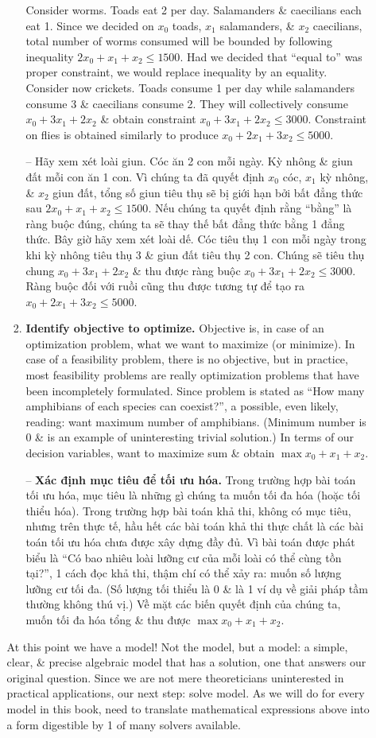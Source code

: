 \documentclass{article}
\begin{document}
\begin{itemize}
\begin{itemize}
\begin{enumerate}
            Consider worms. Toads eat 2 per day. Salamanders \& caecilians each eat 1. Since we decided on $x_0$ toads, $x_1$ salamanders, \& $x_2$ caecilians, total number of worms consumed will be bounded by following inequality $2x_0 + x_1 + x_2\le1500$. Had we decided that ``equal to'' was proper constraint, we would replace inequality by an equality. Consider now crickets. Toads consume 1 per day while salamanders consume 3 \& caecilians consume 2. They will collectively consume $x_0 + 3x_1 + 2x_2$ \& obtain constraint $x_0 + 3x_1 + 2x_2\le3000$. Constraint on flies is obtained similarly to produce $x_0 + 2x_1 + 3x_2\le5000$.

            -- Hãy xem xét loài giun. Cóc ăn 2 con mỗi ngày. Kỳ nhông \& giun đất mỗi con ăn 1 con. Vì chúng ta đã quyết định $x_0$ cóc, $x_1$ kỳ nhông, \& $x_2$ giun đất, tổng số giun tiêu thụ sẽ bị giới hạn bởi bất đẳng thức sau $2x_0 + x_1 + x_2\le1500$. Nếu chúng ta quyết định rằng ``bằng'' là ràng buộc đúng, chúng ta sẽ thay thế bất đẳng thức bằng 1 đẳng thức. Bây giờ hãy xem xét loài dế. Cóc tiêu thụ 1 con mỗi ngày trong khi kỳ nhông tiêu thụ 3 \& giun đất tiêu thụ 2 con. Chúng sẽ tiêu thụ chung $x_0 + 3x_1 + 2x_2$ \& thu được ràng buộc $x_0 + 3x_1 + 2x_2\le3000$. Ràng buộc đối với ruồi cũng thu được tương tự để tạo ra $x_0 + 2x_1 + 3x_2\le5000$.
            \item {\bf Identify objective to optimize.} Objective is, in case of an optimization problem, what we want to maximize (or minimize). In case of a feasibility problem, there is no objective, but in practice, most feasibility problems are really optimization problems that have been incompletely formulated. Since problem is stated as ``How many amphibians of each species can coexist?'', a possible, even likely, reading: want maximum number of amphibians. (Minimum number is 0 \& is an example of uninteresting trivial solution.) In terms of our decision variables, want to maximize sum \& obtain $\max x_0 + x_1 + x_2$.

            -- {\bf Xác định mục tiêu để tối ưu hóa.} Trong trường hợp bài toán tối ưu hóa, mục tiêu là những gì chúng ta muốn tối đa hóa (hoặc tối thiểu hóa). Trong trường hợp bài toán khả thi, không có mục tiêu, nhưng trên thực tế, hầu hết các bài toán khả thi thực chất là các bài toán tối ưu hóa chưa được xây dựng đầy đủ. Vì bài toán được phát biểu là ``Có bao nhiêu loài lưỡng cư của mỗi loài có thể cùng tồn tại?'', 1 cách đọc khả thi, thậm chí có thể xảy ra: muốn số lượng lưỡng cư tối đa. (Số lượng tối thiểu là 0 \& là 1 ví dụ về giải pháp tầm thường không thú vị.) Về mặt các biến quyết định của chúng ta, muốn tối đa hóa tổng \& thu được $\max x_0 + x_1 + x_2$.
        \end{enumerate}
        At this point we have a model! Not the model, but a model: a simple, clear, \& precise algebraic model that has a solution, one that answers our original question. Since we are not mere theoreticians uninterested in practical applications, our next step: solve model. As we will do for every model in this book, need to translate mathematical expressions above into a form digestible by 1 of many solvers available.


\end{itemize}
\end{itemize}
\end{document}
